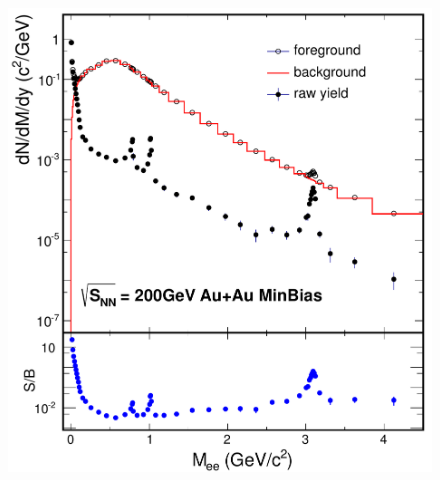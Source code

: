 \begin{lyxcode}
\begin{figure}
\begin{centering}
\begin{minipage}[t][1\totalheight][s]{0.33\columnwidth}%
\begin{center}
\includegraphics[width=1\textwidth]{fig/3.Analysis/background/AuAu/SBRatio_AuAu_MinBias}
\par\end{center}%
\end{minipage}%
\begin{minipage}[t][1\totalheight][s]{0.33\columnwidth}%
\begin{center}

\end{center}
\end{minipage}
\end{centering}
\end{figure}
\end{lyxcode}
